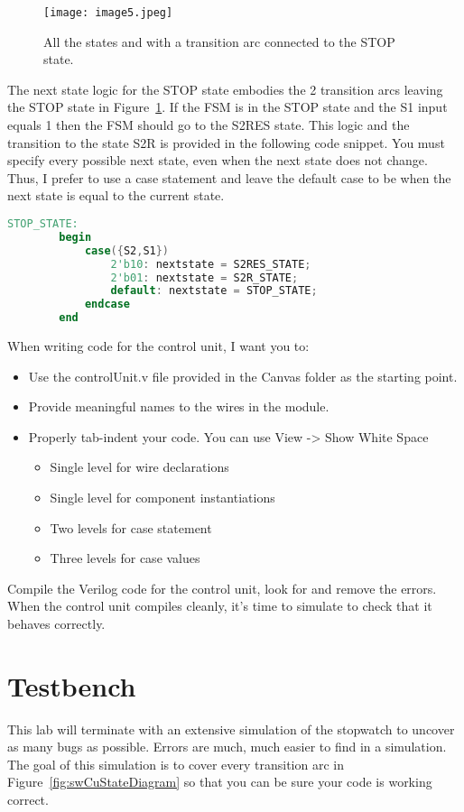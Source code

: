 \begin{figure}[ht]
\texttt{[image: image5.jpeg]}
\caption{All the states and with a transition arc connected to the STOP state.}
\label{fig:swCuStopState}
\end{figure}


The next state logic for the STOP state embodies the 2 transition arcs
leaving the STOP state in Figure~\ref{fig:swCuStopState}. If the FSM is in the STOP state and
the S1 input equals 1 then the FSM should go to the S2RES state. This
logic and the transition to the state S2R is provided in the following
code snippet. You must specify every possible next state, even when the
next state does not change. Thus, I prefer to use a case statement and
leave the default case to be when the next state is equal to the current
state.

\begin{lstlisting}[language=Verilog,  frame=single]
	STOP_STATE:
		begin
			case({S2,S1})
				2'b10: nextstate = S2RES_STATE;
				2'b01: nextstate = S2R_STATE;
				default: nextstate = STOP_STATE;
			endcase
		end
\end{lstlisting}

When writing code for the control unit, I want you to:

\begin{itemize}
\item
  Use the controlUnit.v file provided in the Canvas folder as the
  starting point.
\item
  Provide meaningful names to the wires in the module.
\item
  Properly tab-indent your code. You can use View -\textgreater{} Show
  White Space

  \begin{itemize}
  \item
    Single level for wire declarations
  \item
    Single level for component instantiations
  \item
    Two levels for case statement
  \item
    Three levels for case values
  \end{itemize}
\end{itemize}

Compile the Verilog code for the control unit, look for and remove the
errors. When the control unit compiles cleanly, it's time to simulate to
check that it behaves correctly.

\section{Testbench}
This lab will terminate with an extensive simulation of the stopwatch to 
uncover as many bugs as
possible. Errors are much, much easier to find in a
simulation. The goal of this simulation is to cover every transition arc
in Figure~\ref{fig:swCuStateDiagram} so that you can be sure your code is working correct.

